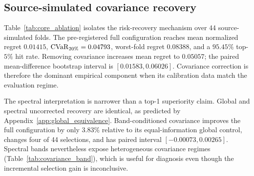 \subsection{Source-simulated covariance recovery}

Table~\ref{tab:core_ablation} isolates the risk-recovery mechanism over 44
source-simulated folds. The pre-registered full configuration reaches mean
normalized regret $0.01415$, $\operatorname{CVaR}_{20\%}=0.04793$, worst-fold regret
$0.08388$, and a $95.45\%$ top-$5\%$ hit rate. Removing covariance increases
mean regret to $0.05057$; the paired mean-difference bootstrap interval is
$[0.01583,0.06026]$. Covariance correction is therefore the dominant
empirical component when its calibration data match the evaluation regime.

\begin{table}[t]
  \caption{Source-simulated recovery attribution over four development tasks
  and 44 held-out shifts. \textit{Cov.} denotes transported covariance and
  \textit{UCB} denotes bootstrap uncertainty. The green $\dagger$ marks the
  proposed pre-registered research configuration; blue $\star$ marks the best
  value.}
  \label{tab:core_ablation}
  \centering
  \small
  \setlength{\tabcolsep}{7pt}
\end{table}

The spectral interpretation is narrower than a top-1 superiority claim.
Global and spectral uncorrected recovery are identical, as predicted by
Appendix~\ref{app:global_equivalence}. Band-conditioned covariance improves
the full configuration by only $3.83\%$ relative to its equal-information
global control, changes four of 44 selections, and has paired interval
$[-0.00073,0.00265]$. Spectral bands nevertheless expose heterogeneous
covariance regimes (Table~\ref{tab:covariance_band}), which is useful for
diagnosis even though the incremental selection gain is inconclusive.

